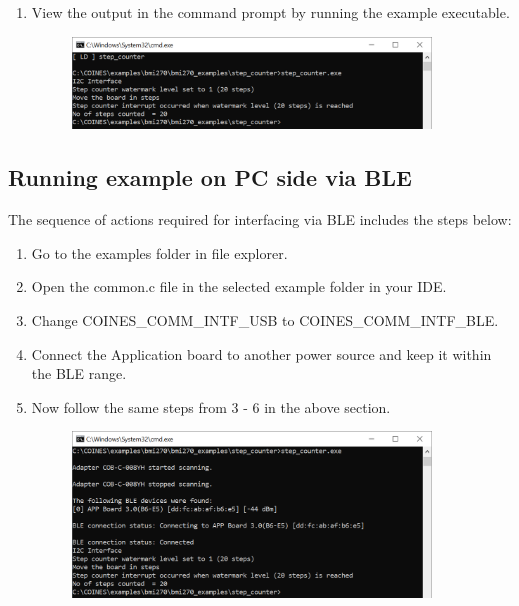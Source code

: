 \documentclass{article}
\begin{document}
\begin{enumerate}
\begin{figure}[H]
\begin{center}
		\end{center}
	\end{figure}
	\item View the output in the command prompt by running the example executable.
	\begin{figure}[H]
		\begin{center}
			\includegraphics[width=0.9\textwidth]{coinesAPI_images/Pc_example_output.png}
		\end{center}
	\end{figure}
\end{enumerate}

\subsection{Running example on PC side via BLE}
The sequence of actions required for interfacing via BLE includes the steps below:
\begin{enumerate}
	\item Go to the examples folder in file explorer.
	\item Open the common.c file in the selected example folder in your IDE.
	\item Change COINES\_COMM\_INTF\_USB  to COINES\_COMM\_INTF\_BLE.
	\item Connect the Application board to another power source and keep it within the BLE range.
	\item Now follow the same steps from 3 - 6 in the above section.
	\begin{figure}[H]
		\begin{center}
			\includegraphics[width=0.9\textwidth]{coinesAPI_images/Pc_example_ble_output.png}
		\end{center}
	\end{figure}
\end{enumerate}
\newpage
\end{document}
